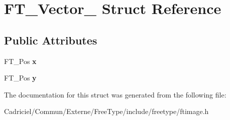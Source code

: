 \hypertarget{struct_f_t___vector__}{}\section{F\+T\+\_\+\+Vector\+\_\+ Struct Reference}
\label{struct_f_t___vector__}
\subsection*{Public Attributes}
\begin{DoxyCompactItemize}
\item 
F\+T\+\_\+\+Pos {\bfseries x}\hypertarget{struct_f_t___vector___a941e818e6dfca06409cddff4f325f74c}{}\label{struct_f_t___vector___a941e818e6dfca06409cddff4f325f74c}

\item 
F\+T\+\_\+\+Pos {\bfseries y}\hypertarget{struct_f_t___vector___ac3246ed214e880047ec74eeb15f8b973}{}\label{struct_f_t___vector___ac3246ed214e880047ec74eeb15f8b973}

\end{DoxyCompactItemize}


The documentation for this struct was generated from the following file\+:\begin{DoxyCompactItemize}
\item 
Cadriciel/\+Commun/\+Externe/\+Free\+Type/include/freetype/ftimage.\+h\end{DoxyCompactItemize}
